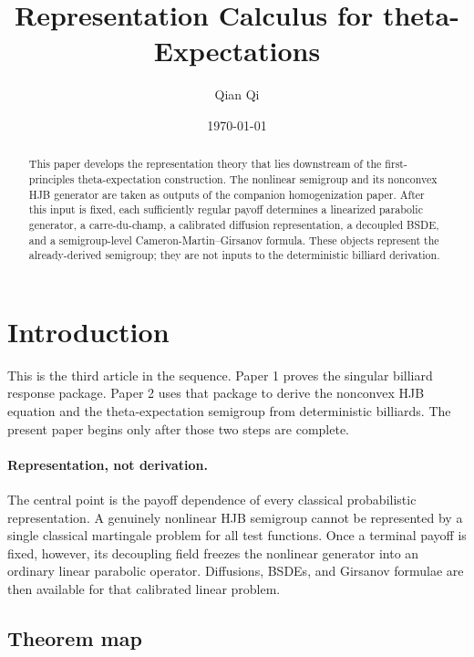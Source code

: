\documentclass[11pt]{amsart}
\title[Representation Calculus for theta-Expectations]{Representation Calculus for theta-Expectations}
\author{Qian Qi}
\date{\today}
\theoremstyle{definition}
\theoremstyle{remark}
\begin{document}
\begin{abstract}
This paper develops the representation theory that lies downstream of the
first-principles theta-expectation construction.  The nonlinear semigroup and
its nonconvex HJB generator are taken as outputs of the companion
homogenization paper.  After this input is fixed, each sufficiently regular
payoff determines a linearized parabolic generator, a carre-du-champ, a
calibrated diffusion representation, a decoupled BSDE, and a semigroup-level
Cameron-Martin--Girsanov formula.  These objects represent the already-derived
semigroup; they are not inputs to the deterministic billiard derivation.
\end{abstract}

\maketitle

\section{Introduction}

This is the third article in the sequence.  Paper 1 proves the singular
billiard response package.  Paper 2 uses that package to derive the nonconvex
HJB equation and the theta-expectation semigroup from deterministic billiards.
The present paper begins only after those two steps are complete.

\paragraph{Representation, not derivation.}
The central point is the payoff dependence of every classical probabilistic
representation.  A genuinely nonlinear HJB semigroup cannot be represented by a
single classical martingale problem for all test functions.  Once a terminal
payoff is fixed, however, its decoupling field freezes the nonlinear generator
into an ordinary linear parabolic operator.  Diffusions, BSDEs, and Girsanov
formulae are then available for that calibrated linear problem.

\subsection{Theorem map}
\end{document}
